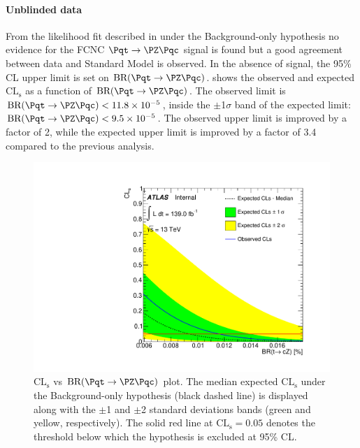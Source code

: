 \paragraph {Unblinded data}
From the likelihood fit described in  under the Background-only hypothesis no evidence for the FCNC $\mathrm{\Pqt\rightarrow\PZ\Pqc}$ signal is found but a good agreement between data and Standard Model is observed.
In the absence of signal, the 95\% CL upper limit is set on $\mathrm{BR (\Pqt\rightarrow\PZ\Pqc)}$.
 shows the observed and expected $\mathrm{CL_{s}}$ as a function of $\mathrm{BR (\Pqt\rightarrow\PZ\Pqc)}$. The observed limit is $\mathrm{BR (\Pqt\rightarrow\PZ\Pqc)}<11.8\times 10^{-5}$, inside the $\pm$1$\sigma$ band of the expected limit: $\mathrm{BR (\Pqt\rightarrow\PZ\Pqc)}<9.5\times 10^{-5}$.
The observed upper limit is improved by a factor of 2, while the expected upper limit is improved by a factor of 3.4 compared to the previous analysis.
\begin{figure}[htbp]
	\centering
	\includegraphics[width=.8\textwidth]{Chapters/CH8/figures/BONLY_CRSR_DL1rc_unblind/CLsPlot}
	\caption{$\mathrm{CL_{s}}$ vs $\mathrm{BR (\Pqt\rightarrow\PZ\Pqc)}$ plot. The median expected $\mathrm{CL_{s}}$ under the Background-only hypothesis
(black dashed line) is displayed along with the $\pm$1 and $\pm$2 standard deviations bands
(green and yellow, respectively). The solid red line at $\mathrm{CL_{s}= 0.05}$ denotes the threshold below
which the hypothesis is excluded at 95\% CL.}
	\label{fig:stat:tzc:splusb:crsr:CLsPlot}
\end{figure}

